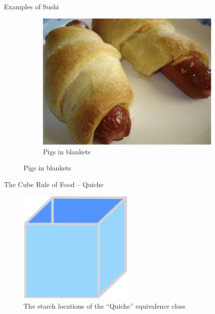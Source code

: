 \documentclass{beamer}
\begin{document}
\begin{frame}{Examples of Sushi}
\begin{figure}
\begin{subfigure}{.4\textwidth}
        \end{subfigure}%
        \begin{subfigure}{.4\textwidth}
          \centering
          \includegraphics[width=.8\linewidth]{images/cube_rule_of_food/sushi/22_pigs.jpg}
          \caption{\label{fig:pigs-in-blankets}Pigs in blankets}
        \end{subfigure}
    \end{figure}
\end{frame}

\begin{frame}{The Cube Rule of Food -- Quiche}
    \begin{figure}
        \includegraphics[width=0.5\textwidth]{images/cube_rule_of_food/quiche/23_quiche.jpg}
        \caption{\label{fig:quiche-diagram}The starch locations of the ``Quiche'' equivalence class}
    \end{figure}
\end{frame}
\end{document}
